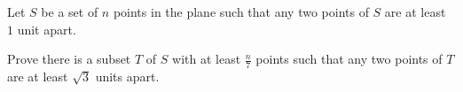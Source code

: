 Let $S$ be a set of $n$ points in the plane such that any two points of $S$ are at least $1$ unit apart.

Prove there is a subset $T$ of $S$ with at least $\frac{n}{7}$ points such that any two points of $T$ are at least $\sqrt{3}$ units apart.